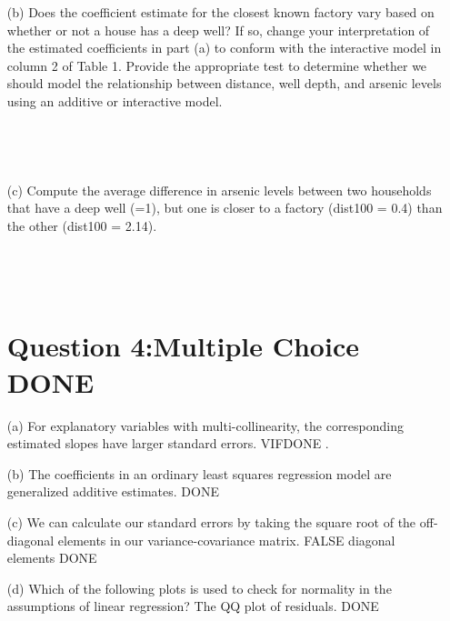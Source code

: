 \documentclass[12pt,letterpaper]{article}
\begin{document}
{\begin{enumerate}
\begin{verbatim}
				
				
			\end{verbatim}
			\item [(b)] Does the coefficient estimate for the closest known factory vary based on whether or not
			a house has a deep well? If so, change your interpretation of the estimated coefficients
			in part (a) to conform with the interactive model in column 2 of Table 1. Provide
			the appropriate test to determine whether we should model the relationship between
			distance, well depth, and arsenic levels using an additive or interactive model.
			
			
			\begin{verbatim}
				
				
				
			\end{verbatim}
			\item [(c)] Compute the average difference in arsenic levels between two households that have a
			deep well (=1), but one is closer to a factory (dist100 = 0.4) than the other (dist100 =
			2.14).
			
			\begin{verbatim}
				
				
				
			\end{verbatim}
			\newpage
			\section*{Question 4:Multiple Choice DONE}
			\item [(a)] For explanatory variables with multi-collinearity, the corresponding estimated slopes have
			larger standard errors.
			VIFDONE .
			
			\item [(b)] The coefficients in an ordinary least squares regression model are generalized additive estimates.
			DONE 
			
			\item [(c)] We can calculate our standard errors by taking the square root of the off-diagonal elements
			in our variance-covariance matrix.
			FALSE
			diagonal elements DONE
			
			\item [(d)] Which of the following plots is used to check for normality in the assumptions of linear
			regression?
			The QQ plot of residuals.
			DONE
			
			\vspace{.5cm}
			\newpage

\end{enumerate}}
\end{document}

